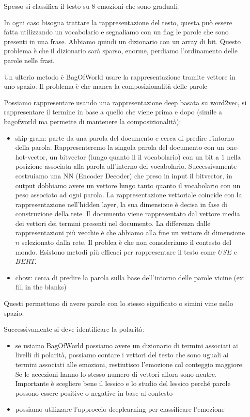 Spesso si classifica il testo su 8 emozioni che sono graduali.

In ogni caso bisogna trattare la rappresentazione del testo, questa può essere 
fatta utilizzando un vocabolario e segnaliamo con un flag le parole che sono presenti
in una frase. Abbiamo quindi un dizionario con un array di bit. Questo problema 
è che il dizionario sarà sparso, enorme, perdiamo l'ordinamento delle parole nelle 
frasi.

Un ulterio metodo è  BagOfWorld usare la rappresentazione tramite vettore in uno spazio.
Il problema è che manca la composizionalità delle parole

Possiamo rappresentare usando una rappresentazione deep basata su word2vec, si rappresentare
il termine in base a quello che viene prima e dopo (simile a bagofworld ma permette 
di mantenere la composizionalità):
\begin{itemize}
    \item skip-gram: parte da una parola del documento e cerca di predire l'intorno della parola.
    Rappresenteremo la singola parola del documento con un one-hot-vector, un bitvector (lungo quanto il
    il vocabolario) con un 
    bit a $1$ nella posizione associata alla parola all'interno del vocabolario.
    Successivamente costruiamo una NN (Encoder Decoder) che preso in input il bitvector, in output
    dobbiamo avere un vettore lungo tanto quanto il vocabolario con un peso associato 
    ad ogni parola. La rappresentazione vettoriale coincide con la rappresentazione 
    nell'hidden layer, la sua dimensione è decisa in fase di construzione della 
    rete. Il documento viene rappresentato dal vettore media dei vettori dei termini
    presenti nel documento. La differenza dalle rappresentazioni più vecchie è che 
    abbiamo alla fine un vettore di dimensione $n$ selezionato dalla rete. Il
    problea è che non consideriamo il contesto del mondo.
    Esistono metodi più efficaci per rappresentare il testo come $USE$ e $BERT$. 
    \item cbow: cerca di predire la parola sulla base dell'intorno delle parole vicine
    (ex: fill in the blanks)
\end{itemize}
Questi permettono di avere parole con lo stesso significato o simini vine nello spazio.

Successivamente si deve identificare la polarità:
\begin{itemize}
    \item se usiamo BagOfWorld possiamo avere un dizionario di termini associati
    ai livelli di polarità, possiamo contare i vettori del testo che sono uguali ai termini
    associati alle emozioni, restiutisco l'emozione col conteggio maggiore. Se 
    le accezioni hanno lo stesso numero di vettori allora sono neutre. 
    Importante è scegliere bene il lessico e lo studio del lessico perché parole 
    possono essere positive o negative in base al contesto
    \item possiamo utilizzare l'approccio deeplearning  per classificare l'emozione
\end{itemize}

